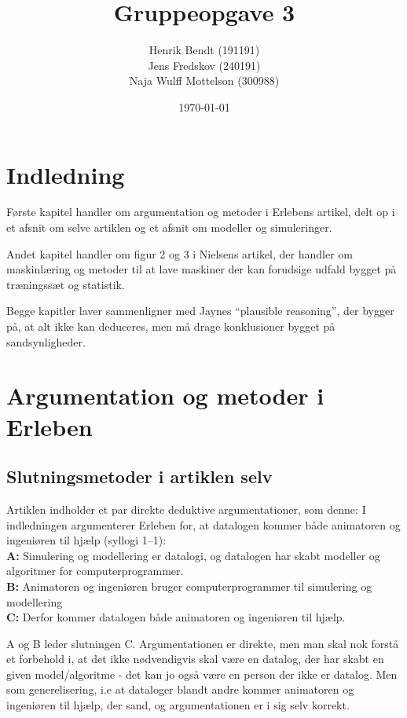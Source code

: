 \documentclass[10pt,a4paper]{article}
\title{Gruppeopgave 3}
\author{Henrik Bendt (191191)\\Jens Fredskov (240191)\\Naja Wulff Mottelson (300988)}
\date{\today}
\begin{document}
\maketitle

\section{Indledning}
Første kapitel handler om argumentation og metoder i Erlebens artikel, delt op i et afsnit om selve artiklen og et afsnit om modeller og simuleringer.

Andet kapitel handler om figur 2 og 3 i Nielsens artikel, der handler om maskinlæring og metoder til at lave maskiner der kan forudsige udfald bygget på træningssæt og statistik.

Begge kapitler laver sammenligner med Jaynes ``plausible reasoning'', der bygger på, at alt ikke kan deduceres, men må drage konklusioner bygget på sandsynligheder.



\section{Argumentation og metoder i Erleben}
\subsection{Slutningsmetoder i artiklen selv}
Artiklen indholder et par direkte deduktive argumentationer, som denne:
I indledningen argumenterer Erleben for, at datalogen kommer både animatoren og ingeniøren til hjælp (syllogi 1--1):
\\ \textbf{A:} Simulering og modellering er datalogi, og datalogen har skabt modeller og algoritmer for computerprogrammer.
\\ \textbf{B:} Animatoren og ingeniøren bruger computerprogrammer til simulering og modellering
\\ \textbf{C:} Derfor kommer datalogen både animatoren og ingeniøren til hjælp.

A og B leder slutningen C. Argumentationen er direkte, men man skal nok forstå et forbehold i, at det ikke nødvendigvis skal være en datalog, der har skabt en given model/algoritme - det kan jo også være en person der ikke er datalog. Men som generelisering, i.e at dataloger blandt andre kommer animatoren og ingeniøren til hjælp, der sand, og argumentationen er i sig selv korrekt.
\end{document}
